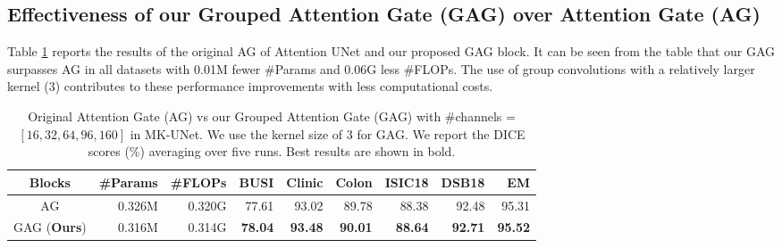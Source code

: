 \subsection{Effectiveness of our Grouped Attention Gate (GAG) over Attention Gate (AG) \cite{oktay2018attention}}
\label{assec:ag_gag}

Table \ref{tab:ablation_ag_vs_gag} reports the results of the original AG of Attention UNet \cite{oktay2018attention} and our proposed GAG block. It can be seen from the table that our GAG surpasses AG in all datasets with 0.01M fewer \#Params and 0.06G less \#FLOPs. The use of group convolutions with a relatively larger kernel ($3$) contributes to these performance improvements with less computational costs.



\begin{table}[!b]
\centering    %
    \begin{adjustbox}{width=0.7\textwidth}
\begin{tabular}{c|r|r|r|r|r|r|r|r}
\toprule
Blocks     & \#Params & \#FLOPs & BUSI & Clinic & Colon & ISIC18 & DSB18 & EM                    \\
\midrule
AG          & 0.326M     & 0.320G     & 77.61  & 93.02 & 89.78 & 88.38 & 92.48 & 95.31  \\
GAG (\textbf{Ours})         & 0.316M    & 0.314G     & \textbf{78.04} & \textbf{93.48} & \textbf{90.01} & \textbf{88.64} & \textbf{92.71} & \textbf{95.52}         \\
\bottomrule 
\end{tabular}
\end{adjustbox}
\caption{Original Attention Gate (AG) \cite{sandler2018mobilenetv2} vs our Grouped Attention Gate (GAG) with \#channels = $[16,32,64,96,160]$ in MK-UNet. We use the kernel size of $3$ for GAG. We report the DICE scores (\%) averaging over five runs. Best results are shown in bold.}
\vspace{-0.4cm}
\label{tab:ablation_ag_vs_gag}
\end{table}


